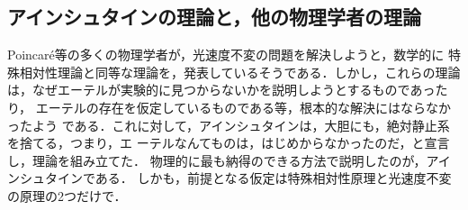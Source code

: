 \subsection{アインシュタインの理論と，他の物理学者の理論}
Poincar\'{e}等の多くの物理学者が，光速度不変の問題を解決しようと，数学的に
特殊相対性理論と同等な理論を，発表しているそうである．しかし，これらの理論
は，なぜエーテルが実験的に見つからないかを説明しようとするものであったり，
エーテルの存在を仮定しているものである等，根本的な解決にはならなかったよう
である．これに対して，アインシュタインは，大胆にも，絶対静止系を捨てる，つまり，エ
ーテルなんてものは，はじめからなかったのだ，と宣言し，理論を組み立てた．
物理的に最も納得のできる方法で説明したのが，アインシュタインである．
しかも，前提となる仮定は特殊相対性原理と光速度不変の原理の2つだけで．
